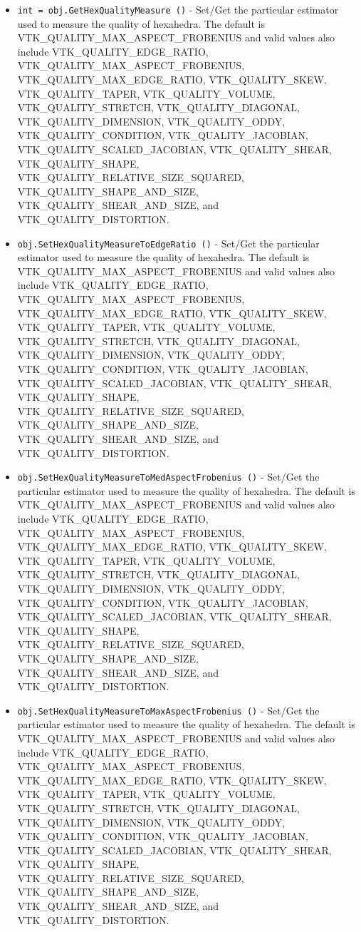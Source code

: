 \begin{itemize}
\item  \verb|int = obj.GetHexQualityMeasure ()| -  Set/Get the particular estimator used to measure the quality of hexahedra.
 The default is VTK\_QUALITY\_MAX\_ASPECT\_FROBENIUS and valid values also include
 VTK\_QUALITY\_EDGE\_RATIO, VTK\_QUALITY\_MAX\_ASPECT\_FROBENIUS, 
 VTK\_QUALITY\_MAX\_EDGE\_RATIO, VTK\_QUALITY\_SKEW, VTK\_QUALITY\_TAPER, VTK\_QUALITY\_VOLUME,
 VTK\_QUALITY\_STRETCH, VTK\_QUALITY\_DIAGONAL, VTK\_QUALITY\_DIMENSION,
 VTK\_QUALITY\_ODDY, VTK\_QUALITY\_CONDITION, VTK\_QUALITY\_JACOBIAN,
 VTK\_QUALITY\_SCALED\_JACOBIAN, VTK\_QUALITY\_SHEAR, VTK\_QUALITY\_SHAPE,
 VTK\_QUALITY\_RELATIVE\_SIZE\_SQUARED, VTK\_QUALITY\_SHAPE\_AND\_SIZE,
 VTK\_QUALITY\_SHEAR\_AND\_SIZE, and VTK\_QUALITY\_DISTORTION.

\item  \verb|obj.SetHexQualityMeasureToEdgeRatio ()| -  Set/Get the particular estimator used to measure the quality of hexahedra.
 The default is VTK\_QUALITY\_MAX\_ASPECT\_FROBENIUS and valid values also include
 VTK\_QUALITY\_EDGE\_RATIO, VTK\_QUALITY\_MAX\_ASPECT\_FROBENIUS, 
 VTK\_QUALITY\_MAX\_EDGE\_RATIO, VTK\_QUALITY\_SKEW, VTK\_QUALITY\_TAPER, VTK\_QUALITY\_VOLUME,
 VTK\_QUALITY\_STRETCH, VTK\_QUALITY\_DIAGONAL, VTK\_QUALITY\_DIMENSION,
 VTK\_QUALITY\_ODDY, VTK\_QUALITY\_CONDITION, VTK\_QUALITY\_JACOBIAN,
 VTK\_QUALITY\_SCALED\_JACOBIAN, VTK\_QUALITY\_SHEAR, VTK\_QUALITY\_SHAPE,
 VTK\_QUALITY\_RELATIVE\_SIZE\_SQUARED, VTK\_QUALITY\_SHAPE\_AND\_SIZE,
 VTK\_QUALITY\_SHEAR\_AND\_SIZE, and VTK\_QUALITY\_DISTORTION.

\item  \verb|obj.SetHexQualityMeasureToMedAspectFrobenius ()| -  Set/Get the particular estimator used to measure the quality of hexahedra.
 The default is VTK\_QUALITY\_MAX\_ASPECT\_FROBENIUS and valid values also include
 VTK\_QUALITY\_EDGE\_RATIO, VTK\_QUALITY\_MAX\_ASPECT\_FROBENIUS, 
 VTK\_QUALITY\_MAX\_EDGE\_RATIO, VTK\_QUALITY\_SKEW, VTK\_QUALITY\_TAPER, VTK\_QUALITY\_VOLUME,
 VTK\_QUALITY\_STRETCH, VTK\_QUALITY\_DIAGONAL, VTK\_QUALITY\_DIMENSION,
 VTK\_QUALITY\_ODDY, VTK\_QUALITY\_CONDITION, VTK\_QUALITY\_JACOBIAN,
 VTK\_QUALITY\_SCALED\_JACOBIAN, VTK\_QUALITY\_SHEAR, VTK\_QUALITY\_SHAPE,
 VTK\_QUALITY\_RELATIVE\_SIZE\_SQUARED, VTK\_QUALITY\_SHAPE\_AND\_SIZE,
 VTK\_QUALITY\_SHEAR\_AND\_SIZE, and VTK\_QUALITY\_DISTORTION.

\item  \verb|obj.SetHexQualityMeasureToMaxAspectFrobenius ()| -  Set/Get the particular estimator used to measure the quality of hexahedra.
 The default is VTK\_QUALITY\_MAX\_ASPECT\_FROBENIUS and valid values also include
 VTK\_QUALITY\_EDGE\_RATIO, VTK\_QUALITY\_MAX\_ASPECT\_FROBENIUS, 
 VTK\_QUALITY\_MAX\_EDGE\_RATIO, VTK\_QUALITY\_SKEW, VTK\_QUALITY\_TAPER, VTK\_QUALITY\_VOLUME,
 VTK\_QUALITY\_STRETCH, VTK\_QUALITY\_DIAGONAL, VTK\_QUALITY\_DIMENSION,
 VTK\_QUALITY\_ODDY, VTK\_QUALITY\_CONDITION, VTK\_QUALITY\_JACOBIAN,
 VTK\_QUALITY\_SCALED\_JACOBIAN, VTK\_QUALITY\_SHEAR, VTK\_QUALITY\_SHAPE,
 VTK\_QUALITY\_RELATIVE\_SIZE\_SQUARED, VTK\_QUALITY\_SHAPE\_AND\_SIZE,
 VTK\_QUALITY\_SHEAR\_AND\_SIZE, and VTK\_QUALITY\_DISTORTION.


\end{itemize}
